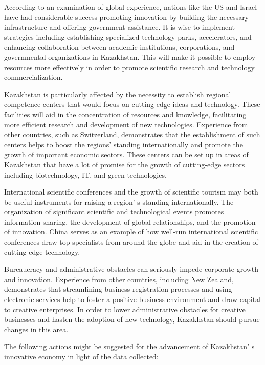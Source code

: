 \begin{multicols}{2}
According to an examination of global experience, nations like the US
and Israel have had considerable success promoting innovation by
building the necessary infrastructure and offering government
assistance. It is wise to implement strategies including establishing
specialized technology parks, accelerators, and enhancing collaboration
between academic institutions, corporations, and governmental
organizations in Kazakhstan. This will make it possible to employ
resources more effectively in order to promote scientific research and
technology commercialization.

Kazakhstan is particularly affected by the necessity to establish
regional competence centers that would focus on cutting-edge ideas and
technology. These facilities will aid in the concentration of resources
and knowledge, facilitating more efficient research and development of
new technologies. Experience from other countries, such as Switzerland,
demonstrates that the establishment of such centers helps to boost the
regions'{} standing internationally and promote the
growth of important economic sectors. These centers can be set up in
areas of Kazakhstan that have a lot of promise for the growth of
cutting-edge sectors including biotechnology, IT, and green
technologies.

International scientific conferences and the growth of scientific
tourism may both be useful instruments for raising a
region' s standing internationally. The organization of
significant scientific and technological events promotes information
sharing, the development of global relationships, and the promotion of
innovation. China serves as an example of how well-run international
scientific conferences draw top specialists from around the globe and
aid in the creation of cutting-edge technology.

Bureaucracy and administrative obstacles can seriously impede corporate
growth and innovation. Experience from other countries, including New
Zealand, demonstrates that streamlining business registration processes
and using electronic services help to foster a positive business
environment and draw capital to creative enterprises. In order to lower
administrative obstacles for creative businesses and hasten the adoption
of new technology, Kazakhstan should pursue changes in this area.

The following actions might be suggested for the advancement of
Kazakhstan' s innovative economy in light of the data
collected:


\end{multicols}
